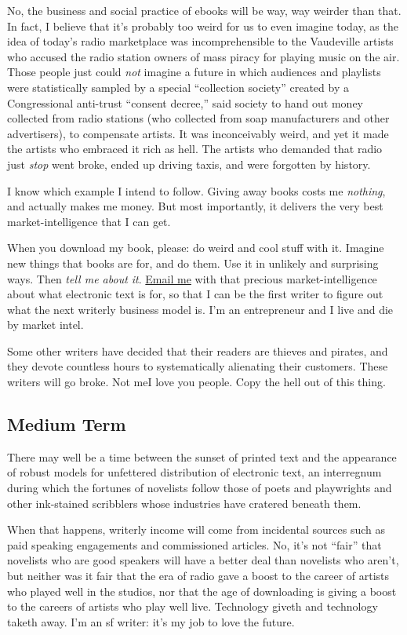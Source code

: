 No, the business and social practice of ebooks will be way, way
weirder than that.  In fact, I believe that it's probably too weird
for us to even imagine today, as the idea of today's radio marketplace
was incomprehensible to the Vaudeville artists who accused the radio
station owners of mass piracy for playing music on the air.  Those
people just could \textit{not} imagine a future in which audiences and
playlists were statistically sampled by a special ``collection
society'' created by a Congressional anti-trust ``consent decree,''
said society to hand out money collected from radio stations (who
collected from soap manufacturers and other advertisers), to
compensate artists.  It was inconceivably weird, and yet it made the
artists who embraced it rich as hell.  The artists who demanded that
radio just \textit{stop} went broke, ended up driving taxis, and were
forgotten by history. 

I know which example I intend to follow.  Giving away books costs me
\textit{nothing}, and actually makes me money.  But most importantly,
it delivers the very best market-intelligence that I can get. 

When you download my book, please:  do weird and cool stuff with it. 
Imagine new things that books are for, and do them.  Use it in
unlikely and surprising ways.  Then \textit{tell me about it}. 
\href{mailto:doctorow@craphound.com}{Email me} with that precious
market-intelligence about what electronic text is for, so that I can
be the first writer to figure out what the next writerly business
model is.  I'm an entrepreneur and I live and die by market intel.

Some other writers have decided that their readers are thieves and
pirates, and they devote countless hours to systematically alienating
their customers.  These writers will go broke.  Not me\dash{}I love you
people.  Copy the hell out of this thing.

\subsection{Medium Term}

There may well be a time between the sunset of printed text and the
appearance of robust models for unfettered distribution of electronic
text, an interregnum during which the fortunes of novelists follow
those of poets and playwrights and other ink-stained scribblers whose
industries have cratered beneath them.

When that happens, writerly income will come from incidental sources
such as paid speaking engagements and commissioned articles.  No, it's
not ``fair'' that novelists who are good speakers will have a better
deal than novelists who aren't, but neither was it fair that the era
of radio gave a boost to the career of artists who played well in the
studios, nor that the age of downloading is giving a boost to the
careers of artists who play well live.  Technology giveth and
technology taketh away.  I'm an sf writer:  it's my job to love the
future.

